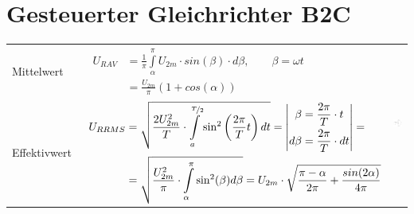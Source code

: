\section{Gesteuerter Gleichrichter B2C}

\begin{tabu}{|l|l|p{0.3\textwidth}}
  Mittelwert 
  	&\ $\begin{aligned}
  			U_{R AV} &= \frac{1}{\pi}\int\limits_{\alpha}^{\pi}U_{2m} \cdot sin(\beta) \cdot d\beta, \qquad \beta = \omega t\\
  						&= \frac{U_{2m}}{\pi}(1 + cos(\alpha))
  		\end{aligned}$ 
  		& \\
  Effektivwert 
  	&\ $\begin{aligned}
  		U_{R RMS} &= \sqrt{\frac{2 U_{2m}^2}{T}\cdot \int\limits_{a}^{\nicefrac{T}{2}} \sin^2\left( \frac{2\pi}{T} t\right) dt} = \left| \begin{aligned} \beta &= \frac{2\pi}{T}\cdot t \\ d\beta &= \frac{2\pi}{T} \cdot dt\end{aligned} \right| =\\
          &= \sqrt{\frac{U_{2m}^2}{\pi}\cdot\int\limits_{\alpha}^{\pi} \sin^2(\beta)d\beta} = U_{2m} \cdot \sqrt{\frac{\pi-\alpha}{2\pi}+\frac{sin(2\alpha)}{4\pi}}
  		\end{aligned}$ &\\
\end{tabu}